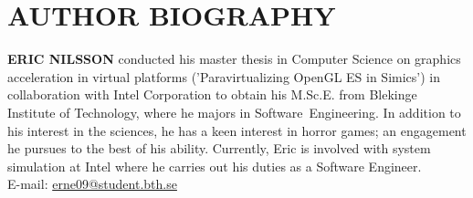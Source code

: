 
\section{AUTHOR BIOGRAPHY}
\label{sec:authorbiography}
\textbf{ERIC NILSSON} conducted his master thesis in Computer Science on graphics acceleration in virtual platforms ('Paravirtualizing OpenGL ES in Simics') in collaboration with Intel Corporation to obtain his M.Sc.E. from Blekinge Institute of Technology, where he majors in Software~Engineering.
In addition to his interest in the sciences, he has a keen interest in horror games; an engagement he pursues to the best of his ability.
Currently, Eric is involved with system simulation at Intel where he carries out his duties as a Software Engineer.\\

E-mail: \href{mailto:erne09@student.bth.se}{erne09@student.bth.se}

